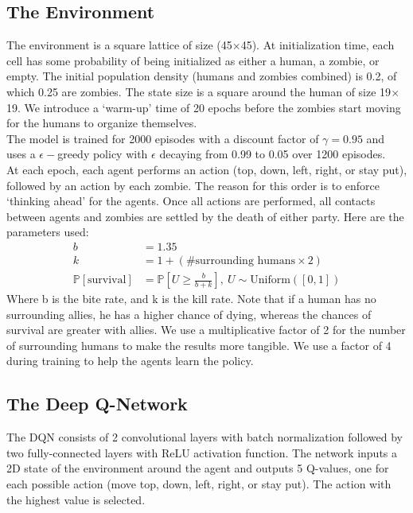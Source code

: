 \documentclass[11pt]{article}
\begin{document}
\subsection{The Environment}
The environment is a square lattice of size (45$\times$45). At initialization time, each cell has some probability of being initialized as either a human, a zombie, or empty. The initial population density (humans and zombies combined) is 0.2, of which 0.25 are zombies. The state size is a square around the human of size 19$\times$19. We introduce a `warm-up' time of 20 epochs before the zombies start moving for the humans to organize themselves.\\
The model is trained for 2000 episodes with a discount factor of $\gamma = 0.95$ and uses a $\epsilon-$greedy policy with $\epsilon$ decaying from 0.99 to 0.05 over 1200 episodes.\\
At each epoch, each agent performs an action (top, down, left, right, or stay put), followed by an action by each zombie. The reason for this order is to enforce `thinking ahead' for the agents. Once all actions are performed, all contacts between agents and zombies are settled by the death of either party. Here are the parameters used:
\begin{align*}
    b                           & = 1.35                                                                         \\
    k                           & = 1 + (\text{\# surrounding humans} \times 2)                                  \\
    \mathbb{P}[\text{survival}] & = \mathbb{P}\left[U \geq \frac{b}{b+k}\right], \ U \sim \text{Uniform}([0, 1])
\end{align*}
Where b is the bite rate, and k is the kill rate. Note that if a human has no surrounding allies, he has a higher chance of dying, whereas the chances of survival are greater with allies. We use a multiplicative factor of 2 for the number of surrounding humans to make the results more tangible. We use a factor of 4 during training to help the agents learn the policy.

\subsection{The Deep Q-Network}
The DQN consists of 2 convolutional layers with batch normalization followed by two fully-connected layers with ReLU activation function. The network inputs a 2D state of the environment around the agent and outputs 5 Q-values, one for each possible action (move top, down, left, right, or stay put). The action with the highest value is selected.
\end{document}

